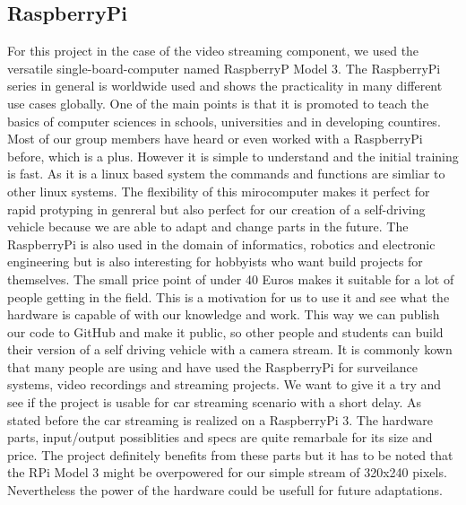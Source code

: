 \documentclass[conference]{IEEEtran}
\begin{document}
\subsection{RaspberryPi}
For this project in the case of the video streaming component, we used the versatile single-board-computer named RaspberryP Model 3. The RaspberryPi series in general is worldwide used and shows the practicality in many different use cases globally. One of the main points is that it is promoted to teach the basics of computer sciences in schools, universities and in developing countires. Most of our group members have heard or even worked with a RaspberryPi before, which is a plus. However it is simple to understand and the initial training is fast. As it is a linux based system the commands and functions are simliar to other linux systems. The flexibility of this mirocomputer makes it perfect for rapid protyping in genreral but also perfect for our creation of a self-driving vehicle because we are able to adapt and change parts in the future. The RaspberryPi is also used in the domain of informatics, robotics and electronic engineering but is also interesting for hobbyists who want build projects for themselves. The small price point of under 40 Euros makes it suitable for a lot of people getting in the field. This is a motivation for us to use it and see what the hardware is capable of with our knowledge and work. This way we can publish our code to GitHub and make it public, so other people and students can build their version of a self driving vehicle with a camera stream. It is commonly kown that many people are using and have used the RaspberryPi for surveilance systems, video recordings and streaming projects. We want to give it a try and see if the project is usable for car streaming scenario with a short delay.
\newline
As stated before the car streaming is realized on a RaspberryPi 3. The hardware parts, input/output possiblities and specs are quite remarbale for its size and price. The project definitely benefits from these parts but it has to be noted that the RPi Model 3 might be overpowered for our simple stream of 320x240 pixels. Nevertheless the power of the hardware could be usefull for future adaptations. 
\end{document}
